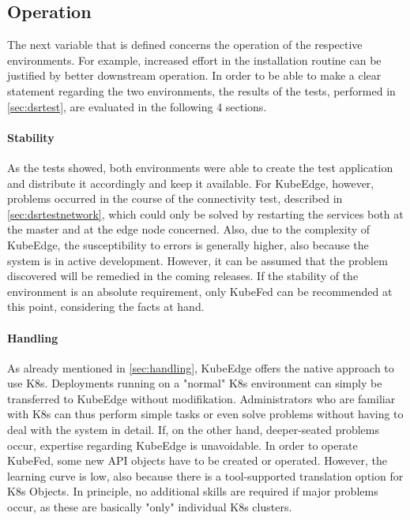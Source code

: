 \documentclass[MSC,Master,english]{twbook}%
\begin{document}
\subsection{Operation}
The next variable that is defined concerns the operation of the respective environments. For example, increased effort in the installation routine can be justified by better downstream operation. In order to be able to make a clear statement regarding the two environments, the results of the tests, performed in \autoref{sec:dsrtest}, are evaluated in the following 4 sections.

\paragraph{Stability} As the tests showed, both environments were able to create the test application and distribute it accordingly and keep it available. For KubeEdge, however, problems occurred in the course of the connectivity test, described in \autoref{sec:dsrtestnetwork}, which could only be solved by restarting the services both at the master and at the edge node concerned. Also, due to the complexity of KubeEdge, the susceptibility to errors is generally higher, also because the system is in active development. However, it can be assumed that the problem discovered will be remedied in the coming releases. If the stability of the environment is an absolute requirement, only KubeFed can be recommended at this point, considering the facts at hand.

\paragraph{Handling} As already mentioned in \autoref{sec:handling}, KubeEdge offers the native approach to use K8s. Deployments running on a "normal" \ac{K8s} environment can simply be transferred to KubeEdge without modifikation. Administrators who are familiar with K8s can thus perform simple tasks or even solve problems without having to deal with the system in detail. If, on the other hand, deeper-seated problems occur, expertise regarding KubeEdge is unavoidable. In order to operate KubeFed, some new API objects have to be created or operated. However, the learning curve is low, also because there is a tool-supported translation option for \ac{K8s} Objects. In principle, no additional skills are required if major problems occur, as these are basically "only" individual \ac{K8s} clusters.
\end{document}
